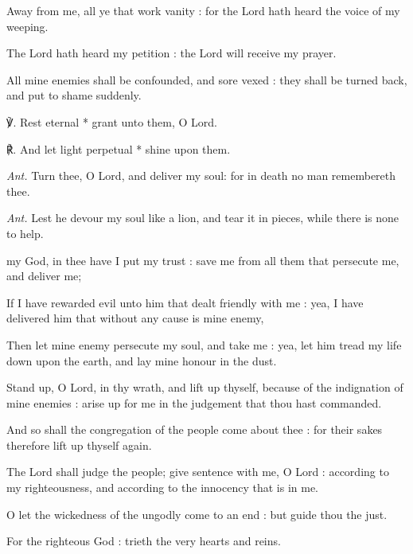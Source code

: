 Away from me, all ye that work vanity : for the Lord hath heard the voice of my weeping.\par
{}The Lord hath heard my petition : the Lord will receive my prayer.\par
{}All mine enemies shall be confounded, and sore vexed : they shall be turned back, and put to shame suddenly.\par
℣. Rest eternal * grant unto them, O Lord.\par
℟. And let light perpetual * shine upon them.\par\noindent
\textit{Ant.} Turn thee, O Lord, and deliver my soul: for in death no man remembereth thee.\par
\vspace{-1ex}
\par\noindent
\textit{Ant.} Lest he devour {\dag} my soul like a lion, and tear it in pieces, while there is none to help.\par
{} my God, in thee have I put my trust : save me from all them that persecute me, and deliver me;\par
{}
If I have rewarded evil unto him that dealt friendly with me : yea, I have delivered him that without any cause is mine enemy,\par
{}Then let mine enemy persecute my soul, and take me : yea, let him tread my life down upon the earth, and lay mine honour in the dust.\par
{}Stand up, O Lord, in thy wrath, and lift up thyself, because of the indignation of mine enemies : arise up for me in the judgement that thou hast commanded.\par
{}And so shall the congregation of the people come about thee : for their sakes therefore lift up thyself again.\par
{}The Lord shall judge the people; give sentence with me, O Lord : according to my righteousness, and according to the innocency that is in me.\par
{}O let the wickedness of the ungodly come to an end : but guide thou the just.\par
{}For the righteous God : trieth the very hearts and reins.\par
